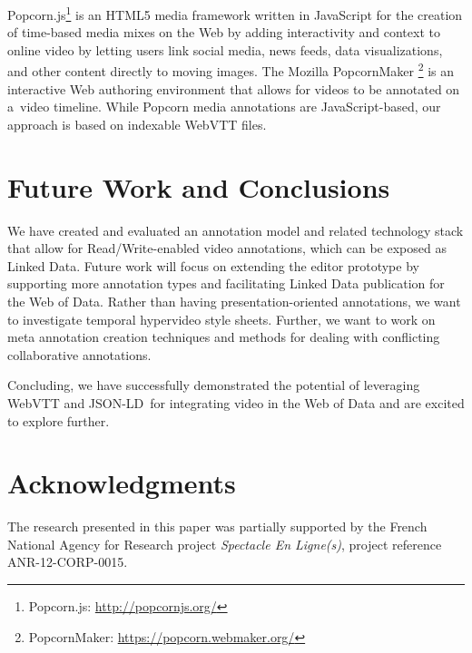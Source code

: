\documentclass{sig-alternate}
\newcommand{\inlinelistingsize}{\fontsize{8pt}{11pt}}
\let\oldurl\url
\renewcommand{\url}[1]{\inlinelistingsize\oldurl{#1}}
\def\JSONLD{\mbox{JSON-LD}}
\begin{document}
Popcorn.js\footnote{Popcorn.js: \url{http://popcornjs.org/}}
is an HTML5 media framework written in JavaScript
for the creation of time-based media mixes on the Web
by adding interactivity and context to online video
by letting users link social media, news feeds,
data visualizations, and other content directly to moving images.
The Mozilla PopcornMaker%
\footnote{PopcornMaker: \url{https://popcorn.webmaker.org/}}
is an interactive Web authoring environment
that allows for videos to be annotated on a~video timeline.
While Popcorn media annotations are JavaScript-based,
our approach is based on indexable WebVTT files.

\section{Future Work and Conclusions}

We have created and evaluated an annotation model
and related technology stack
that allow for Read/Write-enabled video annotations,
which can be exposed as Linked Data.
Future work will focus on extending the editor prototype
by supporting more annotation types and
facilitating Linked Data publication for the Web of Data.
Rather than having presentation-oriented annotations,
we want to investigate temporal hypervideo style sheets.
Further, we want to work on meta annotation creation techniques
and methods for dealing with conflicting collaborative annotations.

Concluding, we have successfully demonstrated the potential
of leveraging WebVTT and \JSONLD~for integrating video
in the Web of Data and are excited to explore further.

\section*{Acknowledgments}
\footnotesize
The research presented in this paper was partially supported
by the French National Agency for Research  project
\emph{Spectacle En Ligne(s)}, project reference
\mbox{ANR-12-CORP-0015}.

\normalsize


\end{document}
